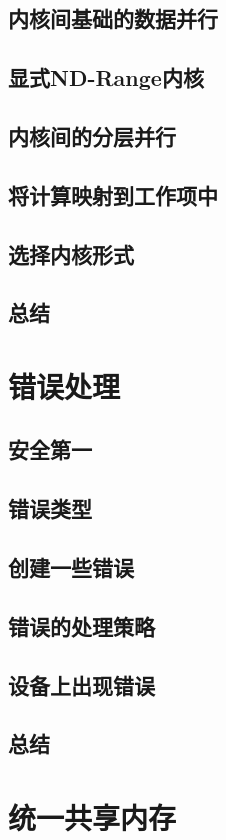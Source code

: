 \documentclass[11pt,a4paper,UTF8]{ctexart}
\begin{document}
		\subsection{内核间基础的数据并行}
		\subsection{显式ND-Range内核}
		\subsection{内核间的分层并行}
		\subsection{将计算映射到工作项中}
		\subsection{选择内核形式}
		\subsection{总结}
	\section{错误处理}
		\subsection{安全第一}
		\subsection{错误类型}
		\subsection{创建一些错误}
		\subsection{错误的处理策略}
		\subsection{设备上出现错误}
		\subsection{总结}
	\section{统一共享内存}
\end{document}
